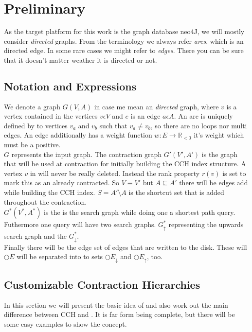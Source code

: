 \chapter{Preliminary}

As the target platform for this work is the graph database neo4J, we will mostly consider \textit{directed} graphs. From the terminology we always refer \textit{arcs}, which is an directed edge.
In some rare cases we might refer to \textit{edges}. There you can be sure that it doesn't matter weather it is directed or not.

\section{Notation and Expressions}
We denote a graph $G(V, A)$ in case me mean an \textit{directed} graph, where $v$ is a vertex contained in the vertices $v \epsilon  V$ and $e$ is an
edge $a \epsilon A$. An arc is uniquely defined by to vertices $v_a$ and $v_b$ such that $v_a \neq v_b$, so there are no loops nor multi edges.
An edge additionally has a weight function $w: E \rightarrow \mathbb{R}_{<0} $ it's weight which must be a positive.
\\
$G$ represents the input graph. The contraction graph $G'(V', A')$ is the graph that will be used at contraction for initially building the CCH index structure. A vertex $v$ in will 
never be really deleted. Instead the rank property $r(v)$ is set to mark this as an already contracted. So $V \equiv V'$ but $A \subseteq A'$ there will be edges add while building
the CCH index. $S = A' \setminus A$ is the shortcut set that is added throughout the contraction. 
\\
$G^*(V^*, A^*)$ is the is the search graph while doing one a shortest path query. Futhermore one query will have two search graphs. $G^*_\uparrow$ representing the upwards search graph
and the $G^*_\downarrow$.
\\
Finally there will be the edge set of edges that are written to the disk. These will $\bigcirc E$ will be separated into to sets $\bigcirc E_\downarrow$ and $\bigcirc E_\uparrow $, too.


\section{Customizable Contraction Hierarchies}\label{sec:Preliminary_CCH}

In this section we will present the basic idea of \cite[Customization Contraction Hierarchies]{CCH} and also work out the main difference between CCH and \cite[Contraction Hierarchies]{Geisberger_2012}.
It is far form being complete, but there will be some easy examples to show the concept.

